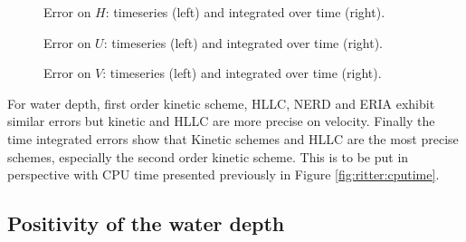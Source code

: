 \begin{figure}[H]
\begin{minipage}[t]{0.45\textwidth}
 \centering
\end{minipage}
\begin{minipage}[t]{0.55\textwidth}
 \centering
\end{minipage}
  \caption{Error on $H$: timeseries (left) and integrated over time (right).}
  \label{fig:ritter:ErrNumH}
\end{figure}

\begin{figure}[H]
\begin{minipage}[t]{0.45\textwidth}
 \centering
\end{minipage}
\begin{minipage}[t]{0.55\textwidth}
 \centering
\end{minipage}
  \caption{Error on $U$: timeseries (left) and integrated over time (right).}
  \label{fig:ritter:ErrNumU}
\end{figure}

\begin{figure}[H]
\begin{minipage}[t]{0.45\textwidth}
 \centering
\end{minipage}
\begin{minipage}[t]{0.55\textwidth}
 \centering
\end{minipage}
  \caption{Error on $V$: timeseries (left) and integrated over time (right).}
  \label{fig:ritter:ErrNumV}
\end{figure}

For water depth, first order kinetic scheme, HLLC, NERD and ERIA exhibit similar
errors but kinetic and HLLC are more precise on velocity.
Finally the time integrated errors show that Kinetic schemes and HLLC are the
most precise schemes, especially the second order kinetic scheme.
This is to be put in perspective with CPU time presented previously
in Figure \ref{fig:ritter:cputime}.

\subsection{Positivity of the water depth}

